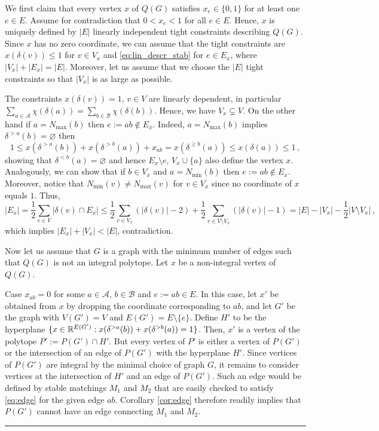 \documentclass[3p,times]{elsarticle}
\newenvironment{proof}{{\bf Proof:  }}{\hfill\rule{2mm}{2mm}}
\begin{document}
\begin{proof}
  We first claim that every vertex $x$ of $Q(G)$ satisfies $x_e
  \in \{0,1\}$ for at least one $e \in E$. Assume for contradiction
  that $0 < x_e < 1$ for all $e \in E$. Hence, $x$ is uniquely defined 
  by $|E|$ linearly independent tight constraints
  describing $Q(G)$. Since $x$ has no zero coordinate, we can assume
  that the tight constraints are $x(\delta(v))\le 1$ for $v\in V_x$
  and \eqref{eq:lin_descr_stab} for $e\in E_x$, where
  $|V_x|+|E_x|=|E|$. Moreover, let us assume that we choose the $|E|$
  tight constraints so that $|V_x|$ is as large as possible.

The constraints $x(\delta(v))=1$, $v\in V$ are linearly dependent, in particular $\sum_{a\in\mathcal{A}}\chi(\delta(a))=\sum_{b\in\mathcal{B}}\chi(\delta(b))$. Hence, we have $V_x\subsetneq V$. On the other hand if $a=N_{\max}(b)$ then $e:=ab\not\in E_x$. Indeed, $a=N_{\max}(b)$ implies $\delta^{>a}(b)=\varnothing$ then
$$
	1\le x(\delta^{>a}(b))+ x(\delta^{>b}(a)) + x_{ab}=x(\delta^{\ge b}(a)) \le x(\delta(a)) \le 1\,,
$$
showing that $\delta^{< b}(a)=\varnothing$ and hence $E_x\setminus e$, $V_x\cup \{a\}$ also define the vertex $x$. Analogously, we can show that if $b\in V_x$  and $a=N_{\min}(b)$ then $e:=ab\not\in E_x$. Moreover, notice that $N_{\min}(v)\neq N_{\max}(v)$ for $v\in V_x$ since no coordinate of $x$ equals $1$. Thus, 
\[
	|E_x|=\frac{1}{2}\sum_{v\in V} |\delta(v)\cap E_x|\le \frac{1}{2}\sum_{v\in V_x} (|\delta(v)|-2)+\frac{1}{2}\sum_{v\in V\setminus V_x} (|\delta(v)|-1)= |E|-|V_x|-\frac{1}{2}|V\setminus V_x|\,,
\]
which implies $|E_x|+|V_x|< |E|$, contradiction.

\bigskip

Now let us assume that $G$ is a graph with the minimum number of edges such that $Q(G)$ is not an integral polytope. Let $x$ be a non-integral vertex of $Q(G)$.

Case $x_{ab}=0$ for some $a\in \mathcal{A}$, $b\in\mathcal{B}$ and
$e:=ab\in E$. In this case, let $x'$ be obtained from $x$ by dropping
the coordinate corresponding to $ab$, and let $G'$ be the graph with
$V(G')=V$ and $E(G') = E \setminus \{e\}$. Define $H'$ to be the
hyperplane
$\{x\in \mathbb{R}^{E(G')}: x(\delta^{>a}(b))+ x(\delta^{>b}(a))=1\}$. Then,
$x'$ is a vertex of the polytope $P':=P(G')\cap H'$.  But every vertex
of $P'$ is either a vertex of $P(G')$ or the intersection of an edge
of $P(G')$ with the hyperplane $H'$. Since vertices of $P(G')$ are
integral by the minimal choice of graph $G$, it remains to consider
vertices at the intersection of $H'$ and an edge of $P(G')$. Such an
edge would be defined by stable matchings $M_1$ and $M_2$ that are
easily checked to satisfy \eqref{eq:edge} for the given edge $ab$.
Corollary \ref{cor:edge} therefore readily implies that $P(G')$ cannot
have an edge connecting $M_1$ and $M_2$.


\end{proof}
\end{document}
